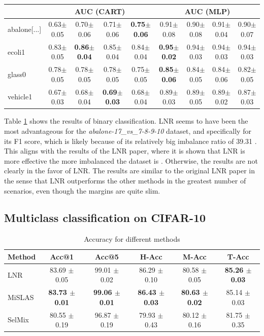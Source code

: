\documentclass{article}
\begin{document}
{\begin{table}[htbp]
{\begin{tabular}{l|cccc|cccc}
\midrule
\multicolumn{1}{c}{} 
& \multicolumn{4}{c}{\textbf{AUC (CART)}} 
& \multicolumn{4}{c}{\textbf{AUC (MLP)}} \\
\midrule

abalone[...] 
& 0.63$\pm$0.05 & 0.70$\pm$0.06 & 0.71$\pm$0.06 & \textbf{0.75$\pm$0.06}
& 0.91$\pm$0.08 & 0.90$\pm$0.08 & 0.91$\pm$0.04 & 0.90$\pm$0.07 \\
ecoli1
& 0.83$\pm$0.05 & \textbf{0.86$\pm$0.04} & 0.85$\pm$0.04 & 0.84$\pm$0.04
& \textbf{0.95$\pm$0.02} & 0.94$\pm$0.03 & 0.94$\pm$0.03 & 0.94$\pm$0.03 \\
glass0
& 0.78$\pm$0.05 & 0.78$\pm$0.05 & 0.78$\pm$0.05 & 0.75$\pm$0.05
& \textbf{0.85$\pm$0.06} & 0.84$\pm$0.05 & 0.84$\pm$0.06 & 0.82$\pm$0.05 \\
vehicle1
& 0.67$\pm$0.03 & 0.68$\pm$0.04 & \textbf{0.69$\pm$0.03} & 0.68$\pm$0.04
& 0.89$\pm$0.03 & 0.89$\pm$0.05 & 0.89$\pm$0.02 & 0.87$\pm$0.03 \\

\bottomrule
\end{tabular}
}
\label{table:KEEL_results}
\end{table}}


Table \ref{table:KEEL_results} shows the results of binary classification. LNR seems to have been the most advantageous for the \textit{abalone-17\_vs\_7-8-9-10} dataset, and specifically for its F1 score, which is likely because of its relatively big imbalance ratio of 39.31 \cite{keel_dataset_ref}. This aligns with the results of the LNR paper, where it is shown that LNR is more effective the more imbalanced the dataset is \cite{lnr}. Otherwise, the results are not clearly in the favor of LNR. The results are similar to the original LNR paper \cite{lnr} in the sense that LNR outperforms the other methods in the greatest number of scenarios, even though the margins are quite slim.


\subsection{Multiclass classification on CIFAR-10}


\begin{table}[hbpt]
\centering
\caption{Accuracy for different methods}
\label{tab:model_comparison}
\begin{tabular}{lccccc}
\toprule
Method & Acc@1 & Acc@5 & H-Acc & M-Acc & T-Acc \\
\midrule
LNR & 83.69 $\pm$ 0.05 & 99.01 $\pm$ 0.02 & 86.29 $\pm$ 0.10 & 80.58 $\pm$ 0.05 & \textbf{85.26 $\pm$ 0.03} \\
MiSLAS   & \textbf{83.73 $\pm$ 0.01} & \textbf{99.06 $\pm$ 0.01} & \textbf{86.43 $\pm$ 0.03} & \textbf{80.63 $\pm$ 0.02} & 85.14 $\pm$ 0.03 \\
SelMix   & 80.55 $\pm$ 0.19 & 96.87 $\pm$ 0.19 & 79.93 $\pm$ 0.43 & 80.12 $\pm$ 0.16 & 81.75 $\pm$ 0.35 \\
\bottomrule
\end{tabular}
\label{table:CIFAR_results}
\end{table}
\end{document}
